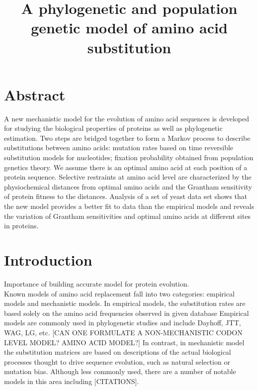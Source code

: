 \documentclass[13pt]{article}
\title{A phylogenetic and population genetic model of amino acid substitution}
\author{}
\begin{document}
\maketitle
\section{Abstract}
A new mechanistic model for the evolution of amino acid sequences is developed for studying the biological properties of proteins as well as phylogenetic estimation.  Two steps are bridged together to form a Markov process to describe substitutions between amino acids: mutation rates based on time reversible substitution models for nucleotides; fixation probability obtained from population genetics theory. We assume there is an optimal amino acid at each position of a protein sequence. Selective restraints at amino acid level are characterized by the physiochemical distances from optimal amino acids and the Grantham sensitivity of protein fitness to the distances. Analysis of a set of yeast data set shows that the new model provides a better fit to data than the empirical models and reveals the variation of Grantham sensitivities and optimal amino acids at different sites in proteins.\\

\section{Introduction}
Importance of building accurate model for protein evolution. \\

Known models of amino acid replacement fall into two categories: empirical models and mechanistic models. 
In empirical models, the substitution rates are based solely on the amino acid frequencies observed in given database
Empirical models are commonly used in phylogenetic studies and include  Dayhoff, JTT, WAG, LG, etc. 
[CAN ONE FORMULATE A NON-MECHANISTIC CODON LEVEL MODEL? AMINO ACID MODEL?]
In contrast, in mechanistic model the substitution matrices are based on descriptions of the actual biological processes thought to drive sequence evolution, such as natural selection or mutation bias.
Although less commonly used, there are a number of notable models in this area including [CITATIONS].
\end{document}

